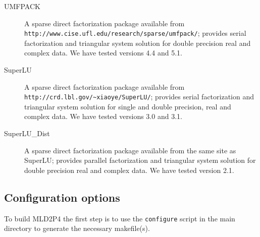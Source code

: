 \begin{description}
\item[UMFPACK] \cite{UMFPACK}
  A sparse direct factorization package available from \\ 
  \verb|http://www.cise.ufl.edu/research/sparse/umfpack/|; 
  provides serial factorization and triangular system solution for double
  precision real and complex data. We have tested
  versions 4.4 and 5.1. 
\item[SuperLU] \cite{SUPERLU}
  A sparse direct factorization package available from \\
  \verb|http://crd.lbl.gov/~xiaoye/SuperLU/|; provides serial
  factorization and triangular system solution for single and double precision,
  real and complex data. We have tested versions 3.0 and 3.1.
\item[SuperLU\_Dist] \cite{SUPERLUDIST}
  A sparse direct factorization package available
  from the same site as SuperLU; provides parallel factorization and
  triangular system solution for double precision real and complex data.
  We have tested version 2.1.
\end{description}

\subsection{Configuration options}

To build  MLD2P4 the first step is to use the \verb|configure| script
in the main directory to generate the necessary makefile(s). 

